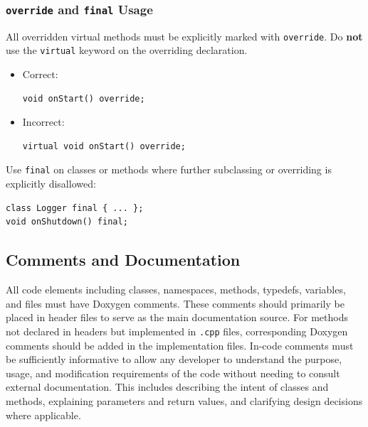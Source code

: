 \subsubsection*{\texttt{override} and \texttt{final} Usage}

All overridden virtual methods must be explicitly marked with \texttt{override}. Do \textbf{not} use the \texttt{virtual} keyword on the overriding declaration.
\begin{itemize}\itemsep0em
  \item Correct:
  \begin{lstlisting}[style=cppstyle]
void onStart() override;
  \end{lstlisting}
  \item Incorrect:
  \begin{lstlisting}[style=cppstyle]
virtual void onStart() override;
  \end{lstlisting}
\end{itemize}
Use \texttt{final} on classes or methods where further subclassing or overriding is explicitly disallowed:
\begin{lstlisting}[style=cppstyle]
class Logger final { ... };
void onShutdown() final;
\end{lstlisting}


\subsection{Comments and Documentation}

All code elements including classes, namespaces, methods, typedefs, variables, and files must have Doxygen comments. These comments should primarily be placed in header files to serve as the main documentation source. For methods not declared in headers but implemented in \texttt{.cpp} files, corresponding Doxygen comments should be added in the implementation files. In-code comments must be sufficiently informative to allow any developer to understand the purpose, usage, and modification requirements of the code without needing to consult external documentation. This includes describing the intent of classes and methods, explaining parameters and return values, and clarifying design decisions where applicable.

